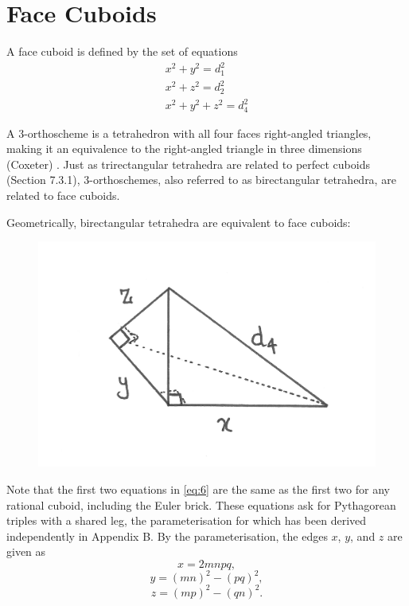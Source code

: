 \documentclass[11pt]{article}
\begin{document}
\section{Face Cuboids}
A face cuboid is defined by the set of equations
\begin{equation}
\begin{aligned}
x^2+y^2=d_1^2 \\
x^2+z^2=d_2^2 \\
x^2+y^2+z^2=d_4^2
\end{aligned}
\label{eq:6}
\end{equation}

A 3-orthoscheme is a tetrahedron with all four faces right-angled triangles, making it an equivalence to the right-angled triangle in three dimensions (Coxeter) \cite{coxeter}. Just as trirectangular tetrahedra are related to perfect cuboids (Section 7.3.1), 3-orthoschemes, also referred to as birectangular tetrahedra, are related to face cuboids.

Geometrically, birectangular tetrahedra are equivalent to face cuboids:

\begin{figure}[h]
\centering
\includegraphics[scale=0.75]{6.png}
\end{figure}

Note that the first two equations in \eqref{eq:6} are the same as the first two for any rational cuboid, including the Euler brick. These equations ask for Pythagorean triples with a shared leg, the parameterisation for which has been derived independently in Appendix B.
By the parameterisation, the edges $x$, $y$, and $z$ are given as
$$x=2mnpq,$$
$$y=(mn)^2-(pq)^2,$$
$$z=(mp)^2-(qn)^2.$$
\end{document}
